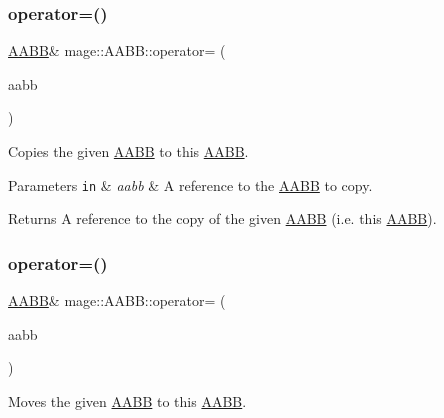 \subsubsection{\texorpdfstring{operator=()}{operator=()}\hspace{0.1cm}{\footnotesize\ttfamily [1/2]}}
{\footnotesize\ttfamily \hyperlink{structmage_1_1_a_a_b_b}{A\+A\+BB}\& mage\+::\+A\+A\+B\+B\+::operator= (\begin{DoxyParamCaption}\item[{const \hyperlink{structmage_1_1_a_a_b_b}{A\+A\+BB} \&}]{aabb }\end{DoxyParamCaption})\hspace{0.3cm}{\ttfamily [default]}}

Copies the given \hyperlink{structmage_1_1_a_a_b_b}{A\+A\+BB} to this \hyperlink{structmage_1_1_a_a_b_b}{A\+A\+BB}.


\begin{DoxyParams}[1]{Parameters}
\mbox{\tt in}  & {\em aabb} & A reference to the \hyperlink{structmage_1_1_a_a_b_b}{A\+A\+BB} to copy. \\
\hline
\end{DoxyParams}
\begin{DoxyReturn}{Returns}
A reference to the copy of the given \hyperlink{structmage_1_1_a_a_b_b}{A\+A\+BB} (i.\+e. this \hyperlink{structmage_1_1_a_a_b_b}{A\+A\+BB}). 
\end{DoxyReturn}
\hypertarget{structmage_1_1_a_a_b_b_a5ca72f9aabc219cd598af6eab6b8b99f}{}\label{structmage_1_1_a_a_b_b_a5ca72f9aabc219cd598af6eab6b8b99f} 
\subsubsection{\texorpdfstring{operator=()}{operator=()}\hspace{0.1cm}{\footnotesize\ttfamily [2/2]}}
{\footnotesize\ttfamily \hyperlink{structmage_1_1_a_a_b_b}{A\+A\+BB}\& mage\+::\+A\+A\+B\+B\+::operator= (\begin{DoxyParamCaption}\item[{\hyperlink{structmage_1_1_a_a_b_b}{A\+A\+BB} \&\&}]{aabb }\end{DoxyParamCaption})\hspace{0.3cm}{\ttfamily [default]}}

Moves the given \hyperlink{structmage_1_1_a_a_b_b}{A\+A\+BB} to this \hyperlink{structmage_1_1_a_a_b_b}{A\+A\+BB}.


